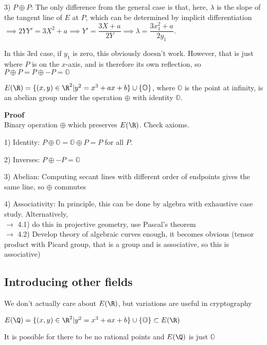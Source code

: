 \documentclass[twoside, 10pt]{article}
\renewcommand{\O}{\mathbb{O}}
\begin{document}
3) $P \oplus P$: The only difference from the general case is that, here, $\lambda$ is the slope of the tangent line of $E$ at $P$, which can be determined by implicit differentiation $\implies 2YY' = 3X^2 + a \implies Y'  = \dfrac{3X + a}{2Y} \implies \lambda = \dfrac{3x_1^2 + a}{2y_1}$. 

\begin{rmk}
    In this 3rd case, if $y_1$ is zero, this obviously doesn't work. However, that is just where $P$ is on the $x$-axis, and is therefore its own reflection, so $P \oplus P = P \oplus -P = \O$
\end{rmk}

\begin{prop}
    $E(\R) = \{(x, y) \in \R^2 | y^2 = x^3 + ax + b\} \cup \{\O\}$, where $\O$ is the point at infinity, is an abelian group under the operation $\oplus$ with identity $\O$. 
\end{prop}
\textbf{Proof}\\
Binary operation $\oplus$ which preserves $E(\R)$. Check axioms.

1) Identity: $P \oplus \O = \O\oplus P = P$ for all $P$.

2) Inverses: $P \oplus -P = \O$

3) Abelian: Computing secant lines with different order of endpoints gives the same line, so $\oplus$ commutes

4) Associativity: In principle, this can be done by algebra with exhaustive case study. Alternatively, \\
$\to$ 4.1) do this in projective geometry, use Pascal's theorem\\
$\to$ 4.2) Develop theory of algebraic curves enough, it becomes obvious (tensor product with Picard group, that is a group and is associative, so this is associative)

\subsection{Introducing other fields}
\begin{rmk}
    We don't actually care about $E(\R)$, but variations are useful in cryptography
\end{rmk}

\begin{defn}
    $E(\Q) = \{(x, y) \in \R^2 | y^2 = x^3 + ax + b\} \cup \{\O\} \subset E(\R)$
\end{defn}

\begin{rmk}
    It is possible for there to be no rational points and $E(\Q)$ is just $\O$
\end{rmk}
\end{document}

